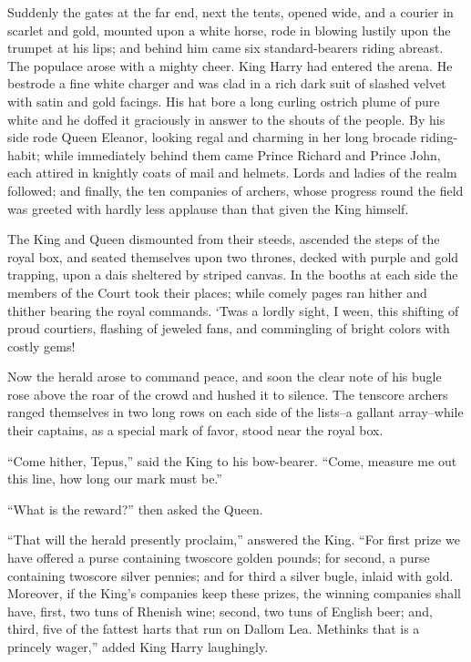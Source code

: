 Suddenly the gates at the far end, next the tents, opened wide, and a
courier in scarlet and gold, mounted upon a white horse, rode in blowing
lustily upon the trumpet at his lips; and behind him came six
standard-bearers riding abreast. The populace arose with a mighty cheer.
King Harry had entered the arena. He bestrode a fine white charger and
was clad in a rich dark suit of slashed velvet with satin and gold
facings. His hat bore a long curling ostrich plume of pure white and he
doffed it graciously in answer to the shouts of the people. By his side
rode Queen Eleanor, looking regal and charming in her long brocade
riding-habit; while immediately behind them came Prince Richard and
Prince John, each attired in knightly coats of mail and helmets. Lords
and ladies of the realm followed; and finally, the ten companies of
archers, whose progress round the field was greeted with hardly less
applause than that given the King himself.

The King and Queen dismounted from their steeds, ascended the steps of
the royal box, and seated themselves upon two thrones, decked with
purple and gold trapping, upon a dais sheltered by striped canvas. In
the booths at each side the members of the Court took their places;
while comely pages ran hither and thither bearing the royal commands.
`Twas a lordly sight, I ween, this shifting of proud courtiers, flashing
of jeweled fans, and commingling of bright colors with costly gems!

Now the herald arose to command peace, and soon the clear note of his
bugle rose above the roar of the crowd and hushed it to silence. The
tenscore archers ranged themselves in two long rows on each side of the
lists--a gallant array--while their captains, as a special mark of
favor, stood near the royal box.

``Come hither, Tepus,'' said the King to his bow-bearer. ``Come, measure
me out this line, how long our mark must be.''

``What is the reward?'' then asked the Queen.

``That will the herald presently proclaim,'' answered the King. ``For
first prize we have offered a purse containing twoscore golden pounds;
for second, a purse containing twoscore silver pennies; and for third a
silver bugle, inlaid with gold. Moreover, if the King's companies keep
these prizes, the winning companies shall have, first, two tuns of
Rhenish wine; second, two tuns of English beer; and, third, five of the
fattest harts that run on Dallom Lea. Methinks that is a princely
wager,'' added King Harry laughingly.

